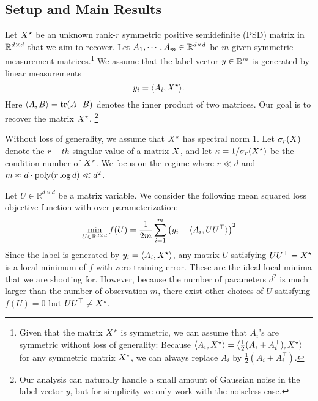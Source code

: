 \subsection{Setup and Main Results}
Let ${X}^\star$ be an unknown rank-$r$ symmetric positive semidefinite (PSD) matrix in $\mathbb{R}^{d\times d}$ that we aim to recover. Let ${A}_1, \cdots, {A}_m \in \mathbb{R}^{d \times d}$ be $m$ given symmetric measurement matrices.\footnote{Given that the matrix ${X}^\star$ is symmetric, we can assume that $A_i$'s are symmetric without loss of generality: Because $\langle A_i, {X}^\star \rangle = \langle \frac{1}{2}(A_i+A_i^\top), {X}^\star \rangle$ for any symmetric matrix ${X}^\star$, we can always replace $A_i$ by $\frac{1}{2}(A_i+A_i^\top)$.} We assume that the label vector $y\in \mathbb{R}^m$ is generated by linear measurements 
$$y_i = \langle {A}_i, {X}^\star \rangle.$$
Here $\langle A, B \rangle = \textup{tr}(A^\top B)$ denotes the inner product of two matrices. Our goal is to recover the matrix ${X}^\star$. \footnote{Our analysis can naturally handle a small amount of Gaussian noise in the label vector $y$, but for simplicity we only work with the noiseless case. }

Without loss of generality, we assume that ${X}^\star$ has spectral norm 1.  Let $\sigma_{r}({X})$ denote the $r-th$ singular value of a matrix ${X}$, and let $\kappa = 1/\sigma_{r}({X}^\star)$ be the condition number of ${X}^\star$. We focus on the regime where $r\ll d$ and $m \approx d\cdot\textup{poly}(r \log d) \ll d^2$.

Let $U\in \mathbb{R}^{d\times d}$ be a matrix variable. We consider the following mean squared loss objective function with over-parameterization:
\begin{align}
\min_{U \in \mathbb{R}^{d \times d}} f({U}) = \frac{1}{2m}\sum_{i = 1}^m \left(y_i- \langle {A}_i, {U} {U}^{\top} \rangle\right)^2\label{eqn:obj}
\end{align}
Since the label is generated by $y_i = \langle A_i, {X}^\star \rangle$, any matrix $U$ satisfying $UU^\top = {X}^\star$ is a local minimum of $f$ with zero training error. These are the ideal local minima that we are shooting for.  However, because the number of parameters $d^2$ is much larger than the number of observation $m$, there exist other choices of $U$ satisfying $f(U) = 0$ but $UU^\top \neq {X}^\star$. 

